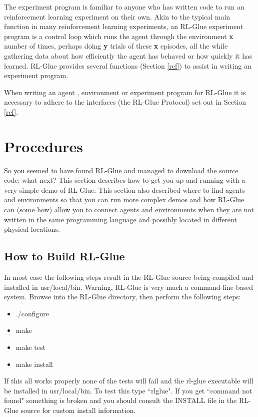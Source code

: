 \documentclass[11pt]{article}
\begin{document}
The experiment program is familiar to anyone who has written code to run an reinforcement learning experiment on their own. Akin to the typical main function in many reinforcement learning experiments, an RL-Glue experiment program is a control loop which runs the agent through the environment {\bf x} number of times, perhaps doing {\bf y} trials of these {\bf x} episodes, all the while gathering data about how efficiently the agent has behaved or how quickly it has learned. RL-Glue provides several functions (Section \ref{ref}) to assist in writing an experiment program.


When writing an agent , environment or experiment program for RL-Glue it is necessary to adhere to the interfaces (the RL-Glue Protocol) set out in Section \ref{ref}. 

\section{Procedures}
So you seemed to have found RL-Glue and managed to download the source code: what next? This section describes how to get you up and running with a very simple demo of RL-Glue. This section also described where to find agents and environments so that you can run more complex demos and how RL-Glue can (some how) allow you to connect agents and environments when they are not written in the same programming language and possibly located in different physical locations.

\subsection{How to Build RL-Glue}
In most case the following steps result in the RL-Glue source being compiled and installed in usr/local/bin. Warning, RL-Glue is very much a command-line based system. Browse into the RL-Glue directory, then perform the following steps:   
\begin{itemize}
\item ./configure
\item make
\item make test
\item make install
\end{itemize}
If this all works properly none of the tests will fail and the rl-glue executable will be installed in usr/local/bin. To test this type ``rlglue". If you get ``command not found" something is broken and you should consult the INSTALL file in the RL-Glue source for custom install information. 
\end{document}
